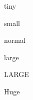 \documentclass[a4paper]{article}
\begin{document}
        \tiny{tiny}

        \small{small}

        \normalsize{normal}

        \large{large}

        \LARGE{LARGE}

        \Huge{Huge}
\end{document}
